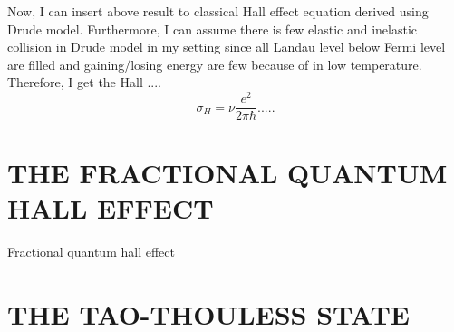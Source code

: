 \documentclass[%
 reprint,
 amsmath,amssymb,
 aps,
 prl,
]{revtex4-1}
\begin{document}
Now, I can insert above result to classical Hall effect equation derived using Drude model. Furthermore, I can assume there is few elastic and inelastic collision in Drude model in my setting since all Landau level below Fermi level are filled and gaining/losing energy are few because of in low temperature. Therefore, I get the Hall ....
\begin{equation}
    \sigma_H = \nu \frac{e^2}{2\pi\hbar}.....
\end{equation}
\section{THE FRACTIONAL QUANTUM HALL EFFECT}
Fractional quantum hall effect 
\section{THE TAO-THOULESS STATE}


\end{document}
